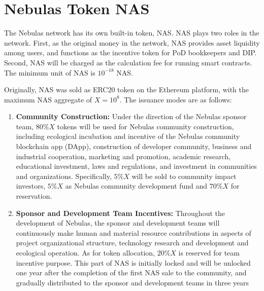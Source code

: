 \section{Nebulas Token NAS}
\label{sec:nascoin}

The Nebulas network has its own built-in token, NAS. NAS plays two roles in the network. First, as the original money in the network, NAS provides asset liquidity among users, and functions as the incentive token for PoD bookkeepers and DIP. Second, NAS will be charged as the calculation fee for running smart contracts. The minimum unit of NAS is $10^{-18}$ NAS.


Originally, NAS was sold as ERC20 token on the Ethereum platform, with the maximum NAS aggregate of $X = 10^8.$ The issuance modes are as follows:

\begin{enumerate}
	\item \textbf{Community Construction:}
	Under the direction of the Nebulas sponsor team, $80\%X$ tokens will be used for Nebulas community construction, including ecological incubation and incentive of the Nebulas community blockchain app (DApp), construction of developer community, business and industrial cooperation, marketing and promotion, academic research, educational investment, laws and regulations, and investment in communities and organizations. Specifically, $5\%X$ will be sold to community impact investors, $5\%X$ as Nebulas community development fund and $70\%X$ for reservation.
	

	\item \textbf{Sponsor and Development Team Incentives:}
	Throughout the development of Nebulas, the sponsor and development teams will continuously make human and material resource contributions in aspects of project organizational structure, technology research and development and ecological operation. As for token allocation, $20\%X$ is reserved for team incentive purpose. This part of NAS is initially locked and will be unlocked one year after the completion of the first NAS sale to the community, and gradually distributed to the sponsor and development teams in three years
	
\end{enumerate}


